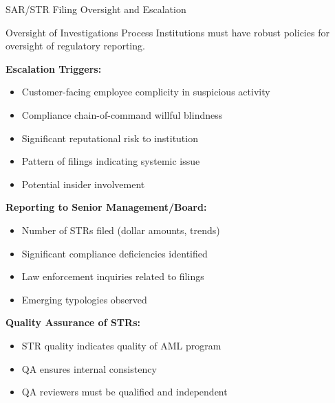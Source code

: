 \documentclass[11pt,a4paper]{beamer}
\begin{document}
	\begin{frame}{SAR/STR Filing Oversight and Escalation}
		\begin{block}{Oversight of Investigations Process}
			Institutions must have robust policies for oversight of regulatory reporting.
		\end{block}
		\textbf{Escalation Triggers:}
		\begin{itemize}
			\item Customer-facing employee complicity in suspicious activity
			\item Compliance chain-of-command willful blindness
			\item Significant reputational risk to institution
			\item Pattern of filings indicating systemic issue
			\item Potential insider involvement
		\end{itemize}
		\textbf{Reporting to Senior Management/Board:}
		\begin{itemize}
			\item Number of STRs filed (dollar amounts, trends)
			\item Significant compliance deficiencies identified
			\item Law enforcement inquiries related to filings
			\item Emerging typologies observed
		\end{itemize}
		\textbf{Quality Assurance of STRs:}
		\begin{itemize}
			\item STR quality indicates quality of AML program
			\item QA ensures internal consistency
			\item QA reviewers must be qualified and independent
		\end{itemize}
	\end{frame}
	
\end{document}
